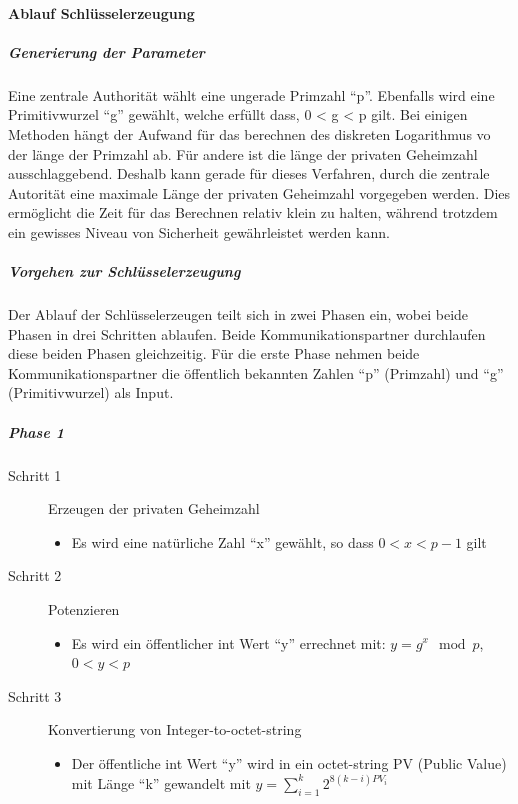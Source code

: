 \documentclass[10pt,a4paper]{article}
\begin{document}
\paragraph{Ablauf Schlüsselerzeugung}

\subparagraph{Generierung der Parameter}
Eine zentrale Authorität wählt eine ungerade Primzahl "`p"'. Ebenfalls wird eine
Primitivwurzel "`g"' gewählt, welche erfüllt dass, 0 < g < p gilt. Bei einigen Methoden
hängt der Aufwand für das berechnen des diskreten Logarithmus vo der länge der Primzahl
ab. Für andere ist die länge der privaten Geheimzahl ausschlaggebend. Deshalb kann gerade
für dieses Verfahren, durch die zentrale Autorität eine maximale Länge der privaten
Geheimzahl vorgegeben werden. Dies ermöglicht die Zeit für das Berechnen relativ klein zu
halten, während trotzdem ein gewisses Niveau von Sicherheit gewährleistet werden kann.

\subparagraph{Vorgehen zur Schlüsselerzeugung}
Der Ablauf der Schlüsselerzeugen teilt sich in zwei Phasen ein, wobei beide Phasen in drei
Schritten ablaufen. Beide Kommunikationspartner durchlaufen diese beiden Phasen gleichzeitig.
Für die erste Phase nehmen beide Kommunikationspartner die öffentlich bekannten Zahlen
"`p"' (Primzahl) und "`g"' (Primitivwurzel) als Input.

\subparagraph{Phase 1}
\begin{description}
    \item[Schritt 1] Erzeugen der privaten Geheimzahl
        \begin{itemize}
            \item Es wird eine natürliche Zahl "`x"' gewählt, so dass $0 < x < p - 1$ gilt
        \end{itemize}
    \item[Schritt 2] Potenzieren
        \begin{itemize}
            \item Es wird ein öffentlicher int Wert "`y"' errechnet mit: $y = g^x \mod
                p$, $0 < y < p$
        \end{itemize}
    \item[Schritt 3] Konvertierung von Integer-to-octet-string
        \begin{itemize}
            \item Der öffentliche int Wert "`y"' wird in ein octet-string PV (Public
                Value) mit Länge "`k"' gewandelt mit $y = \sum_{i=1}^k 2^{8(k-i) PV_i}$
        \end{itemize}
\end{description}
\end{document}
